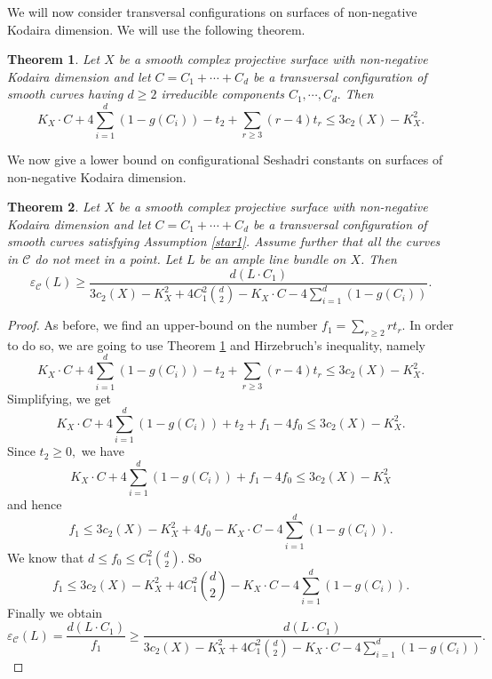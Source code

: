\documentclass[12pt,reqno]{amsart}
\theoremstyle{plain}
\numberwithin{equation}{section}
\newtheorem{theorem}{Theorem}[section]
\theoremstyle{definition}
\begin{document}
	

	
	
	
	
	We will now consider transversal configurations on surfaces of non-negative Kodaira dimension. We will use the following theorem. 
	\begin{theorem}\cite[Theorem 2.1]{LP1} \label{LP}
		Let $X$ be a smooth complex projective surface with non-negative Kodaira dimension and let $C=C_1 + \cdots + C_d$ be a transversal configuration of smooth curves having $d\geq 2$ irreducible components $C_1, \cdots, C_d.$ Then
		\begin{equation*}
			K_X \cdot C + 4 \sum_{i=1}^{d} (1-g(C_i))-t_2+\sum_{r \geq 3} (r-4)t_r \leq 3c_2(X)-K_X^2.
		\end{equation*}
	\end{theorem}
	We now give a lower bound on configurational Seshadri constants on surfaces of non-negative Kodaira dimension.
 
	\begin{theorem}
		Let $X$ be a smooth complex projective surface with non-negative Kodaira dimension and let $C=C_1 + \cdots + C_d$ be a transversal configuration of smooth curves satisfying Assumption \ref{star1}. Assume further that all the curves in $\mathcal{C}$ do not meet in a point. 
  Let $L$ be an ample line bundle on $X$. Then
		$$\varepsilon_{\mathcal{C}}(
		L) \geq \frac{d(L\cdot C_1)}{3c_2(X)-K_X^2+4C_1^2 {d \choose 2}-K_X \cdot C-4 \sum_{i=1}^{d} (1-g(C_i))}.$$
	\end{theorem}
	\begin{proof}
		As before, we find an upper-bound on the number $f_{1} = \sum_{r\geq 2} rt_{r}$. In order to do so, we are going to use Theorem \ref{LP} and Hirzebruch's inequality, namely
		\begin{equation*}
			K_X \cdot C + 4 \sum_{i=1}^{d} (1-g(C_i))-t_2+\sum_{r \geq 3} (r-4)t_r \leq 3c_2(X)-K_X^2.
		\end{equation*}
		Simplifying, we get 
		\begin{equation*}
			K_X \cdot C + 4 \sum_{i=1}^{d} (1-g(C_i))+t_2+f_1-4f_0\leq 3c_2(X)-K_X^2.
		\end{equation*}	
		Since $t_2 \geq 0,$ we have 
		\begin{equation*}
			K_X \cdot C + 4 \sum_{i=1}^{d} (1-g(C_i))+f_1-4f_0\leq 3c_2(X)-K_X^2
		\end{equation*}	
		and hence 
		\begin{equation*}
			f_1\leq 3c_2(X)-K_X^2+4f_0-K_X \cdot C-4 \sum_{i=1}^{d} (1-g(C_i)).
		\end{equation*}	
		We know that
			$d \leq f_0 \leq C_1^2 {d \choose 2}$. So 
		\begin{equation*}
			f_1\leq 3c_2(X)-K_X^2+4C_1^2 {d \choose 2}-K_X \cdot C-4 \sum_{i=1}^{d} (1-g(C_i)). 
		\end{equation*}	
		Finally we obtain
		\begin{equation*}
			\varepsilon_\mathcal{C}(L)=\frac{d(L\cdot C_1)}{f_1} \geq \frac{d(L\cdot C_1)}{3c_2(X)-K_X^2+4C_1^2 {d \choose 2}-K_X \cdot C-4 \sum_{i=1}^{d} (1-g(C_i))}.
		\end{equation*}		
	\end{proof}
\end{document}
